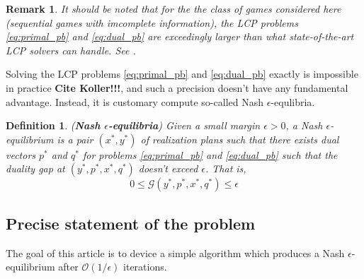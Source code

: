 \documentclass[12pt]{article}
\newtheorem{remark}{Remark}
\newtheorem{definition}[theorem]{Definition}
\begin{document}

\begin{remark}  
It should be noted that for the the class of games considered here (sequential games with imcomplete information), the LCP problems \eqref{eq:primal_pb} and \eqref{eq:dual_pb} are exceedingly larger than what state-of-the-art LCP solvers can handle. See \cite{hoda2010smoothing}.
\end{remark}

Solving the LCP problems \eqref{eq:primal_pb} and \eqref{eq:dual_pb} exactly is impossible in practice \textbf{Cite Koller!!!}, and such a precision doesn't have any fundamental advantage. Instead, it is customary compute so-called Nash $\epsilon$-equlibria.

\begin{definition}(\textbf{Nash $\epsilon$-equilibria})
Given a small margin $\epsilon > 0$, a Nash $\epsilon$-equilibrium is a pair $(x^*, y^*)$ of realization plans such that there exists dual vectors $p^*$ and $q^*$ for problems \eqref{eq:primal_pb} and \eqref{eq:dual_pb} such that the duality gap at $(y^*, p^*, x^*, q^*)$ doesn't exceed $\epsilon$. That is,
\begin{equation}
  0 \le \mathcal{G}(y^*, p^*, x^*, q^*) \le \epsilon
\label{eq:approx_pb}
\end{equation}
\end{definition}

\subsection{Precise statement of the problem}
The goal of this article is to device a simple algorithm which produces a Nash $\epsilon$-equilibrium after $\mathcal{O}(1/\epsilon)$ iterations.
\end{document}
